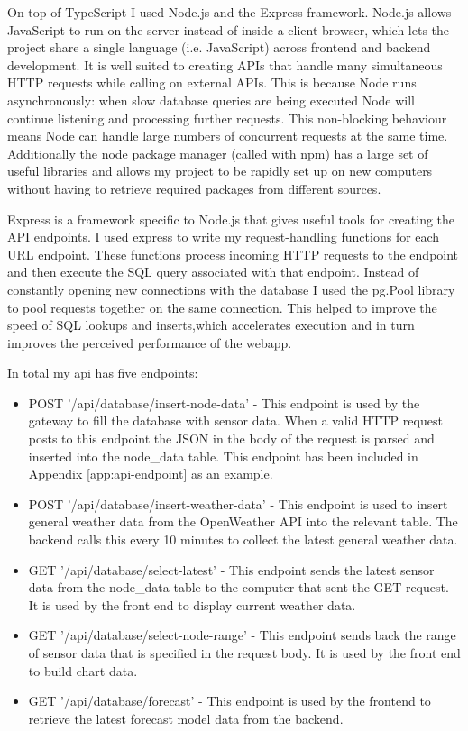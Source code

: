 On top of TypeScript I used Node.js and the Express framework. Node.js allows
JavaScript to run on the server instead of inside a client browser, which lets
the project share a single language (i.e. JavaScript) across frontend and
backend development. It is well suited to creating APIs that handle many
simultaneous HTTP requests while calling on external APIs. This is because Node
runs asynchronously: when slow database queries are being executed Node will
continue listening and processing further requests. This non-blocking behaviour
means Node can handle large numbers of concurrent requests at the same time.
Additionally the node package manager (called with npm) has a large set of
useful libraries and allows my project to be rapidly set up on new computers
without having to retrieve required packages from different sources.

Express is a framework specific to Node.js that gives useful tools for creating
the API endpoints. I used express to write my request-handling functions for
each URL endpoint. These functions process incoming HTTP requests to the
endpoint and then execute the SQL query associated with that endpoint. Instead
of constantly opening new connections with the database I used the pg.Pool
library to pool requests together on the same connection. This helped to improve
the speed of SQL lookups and inserts,which accelerates execution and in turn
improves the perceived performance of the webapp.

In total my api has five endpoints:

\begin{itemize}
    \item POST '/api/database/insert-node-data' - This endpoint is used by the
          gateway to fill the database with sensor data. When a valid HTTP
          request posts to this endpoint the JSON in the body of the request is
          parsed and inserted into the node\_data table. This endpoint has been
          included in Appendix \ref{app:api-endpoint} as an example.
    \item POST '/api/database/insert-weather-data' - This endpoint is used to
          insert general weather data from the OpenWeather API into the relevant
          table. The backend calls this every 10 minutes to collect the latest
          general weather data.
    \item GET '/api/database/select-latest' - This endpoint sends the latest
          sensor data from the node\_data table to the computer that sent the
          GET request. It is used by the front end to display current weather
          data.
    \item GET '/api/database/select-node-range' - This endpoint sends back the
          range of sensor data that is specified in the request body. It is used
          by the front end to build chart data.
    \item GET '/api/database/forecast' - This endpoint is used by the frontend
          to retrieve the latest forecast model data from the backend.
\end{itemize}

